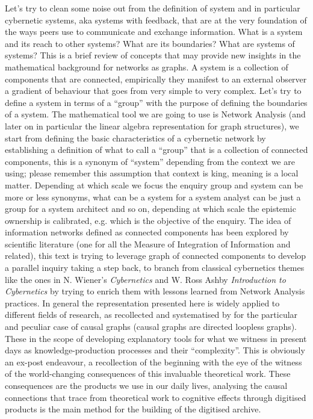 \documentclass[14pt]{extarticle}
\begin{document}
\hspace*{15mm}Let’s try to clean some noise out from the definition of system and in particular cybernetic systems, aka systems with feedback, that are at the very foundation of the ways peers use to communicate and exchange information. What is a system and its reach to other systems? What are its boundaries? What are systems of systems? This is a brief review of concepts that may provide new insights in the mathematical background for networks as graphs.
\newline
\hspace*{15mm}A system is a collection of components that are connected, empirically they manifest to an external observer a gradient of behaviour that goes from very simple to very complex. Let’s try to define a system in terms of a “group” with the purpose of defining the boundaries of a system. The mathematical tool we are going to use is Network Analysis (and later on in particular the linear algebra representation for graph structures), we start from defining the basic characteristics of a cybernetic network by establishing a definition of what to call a “group” that is a collection of connected components, this is a synonym of “system” depending from the context we are using; please remember this assumption that context is king, meaning is a local matter. Depending at which scale we focus the enquiry group and system can be more or less synonyms, what can be a system for a system analyst can be just a group for a system architect and so on, depending at which scale the epistemic ownership is calibrated, e.g. which is the objective of the enquiry.
\newline
The idea of information networks defined as connected components has been explored by scientific literature (one for all the Measure of Integration of Information \cite{TONONIintegrated} and related), this text is trying to leverage graph of connected components to develop a parallel inquiry taking a step back, to branch from classical cybernetics themes like the ones in N. Wiener's \textit{Cybernetics} and W. Ross Ashby \textit{Introduction to Cybernetics} by trying to enrich them with lessons learned from Network Analysis practices. In general the representation presented here is widely applied to different fields of research, as recollected and systematised by \cite{Pearl2010} for the particular and peculiar case of causal graphs (causal graphs are directed loopless graphs). These in the scope of developing explanatory tools for what we witness in present days as knowledge-production processes and their “complexity”. This is obviously an ex-post endeavour, a recollection of the beginning with the eye of the witness of the world-changing consequences of this invaluable theoretical work. These consequences are the products we use in our daily lives, analysing the causal connections that trace from theoretical work to cognitive effects through digitised products is the main method for the building of the digitised archive.
\end{document}
